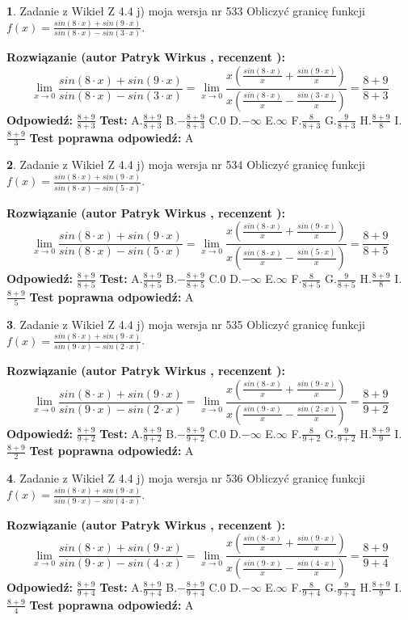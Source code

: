 \documentclass[12pt, a4paper]{article}
\theoremstyle{definition} %
\newtheorem{zad}{}
\newcommand{\zadStart}[1]{\begin{zad}#1\newline}
\newcommand{\zadStop}{\end{zad}}
\newcommand{\rozwStart}[2]{\noindent \textbf{Rozwiązanie (autor #1 , recenzent #2): }\newline}
\newcommand{\rozwStop}{\newline}
\newcommand{\odpStart}{\noindent \textbf{Odpowiedź:}\newline}
\newcommand{\odpStop}{\newline}
\newcommand{\testStart}{\noindent \textbf{Test:}\newline}
\newcommand{\testStop}{\newline}
\newcommand{\kluczStart}{\noindent \textbf{Test poprawna odpowiedź:}\newline}
\newcommand{\kluczStop}{\newline}
\begin{document}
\zadStart{Zadanie z Wikieł Z 4.4 j) moja wersja nr 533}
Obliczyć granicę funkcji $f(x)=\frac{sin(8\cdot x) +sin(9\cdot x)}{sin(8\cdot x) -sin(3\cdot x)}$.
\zadStop
\rozwStart{Patryk Wirkus}{}
$$\lim\limits_{x\to 0}\frac{sin(8\cdot x) +sin(9\cdot x)}{sin(8\cdot x) -sin(3\cdot x)}=\lim\limits_{x\to 0}\frac{x(\frac{sin(8\cdot x)}{x}+\frac{sin(9\cdot x)}{x})}{x(\frac{sin(8\cdot x)}{x}-\frac{sin(3\cdot x)}{x})}=\frac{8+9}{8+3}$$
\rozwStop
\odpStart
$\frac{8+9}{8+3}$
\odpStop
\testStart
A.$\frac{8+9}{8+3}$
B.$-\frac{8+9}{8+3}$
C.$0$
D.$-\infty$
E.$\infty$
F.$\frac{8}{8+3}$
G.$\frac{9}{8+3}$
H.$\frac{8+9}{8}$
I.$\frac{8+9}{3}$
\testStop
\kluczStart
A
\kluczStop



\zadStart{Zadanie z Wikieł Z 4.4 j) moja wersja nr 534}
Obliczyć granicę funkcji $f(x)=\frac{sin(8\cdot x) +sin(9\cdot x)}{sin(8\cdot x) -sin(5\cdot x)}$.
\zadStop
\rozwStart{Patryk Wirkus}{}
$$\lim\limits_{x\to 0}\frac{sin(8\cdot x) +sin(9\cdot x)}{sin(8\cdot x) -sin(5\cdot x)}=\lim\limits_{x\to 0}\frac{x(\frac{sin(8\cdot x)}{x}+\frac{sin(9\cdot x)}{x})}{x(\frac{sin(8\cdot x)}{x}-\frac{sin(5\cdot x)}{x})}=\frac{8+9}{8+5}$$
\rozwStop
\odpStart
$\frac{8+9}{8+5}$
\odpStop
\testStart
A.$\frac{8+9}{8+5}$
B.$-\frac{8+9}{8+5}$
C.$0$
D.$-\infty$
E.$\infty$
F.$\frac{8}{8+5}$
G.$\frac{9}{8+5}$
H.$\frac{8+9}{8}$
I.$\frac{8+9}{5}$
\testStop
\kluczStart
A
\kluczStop



\zadStart{Zadanie z Wikieł Z 4.4 j) moja wersja nr 535}
Obliczyć granicę funkcji $f(x)=\frac{sin(8\cdot x) +sin(9\cdot x)}{sin(9\cdot x) -sin(2\cdot x)}$.
\zadStop
\rozwStart{Patryk Wirkus}{}
$$\lim\limits_{x\to 0}\frac{sin(8\cdot x) +sin(9\cdot x)}{sin(9\cdot x) -sin(2\cdot x)}=\lim\limits_{x\to 0}\frac{x(\frac{sin(8\cdot x)}{x}+\frac{sin(9\cdot x)}{x})}{x(\frac{sin(9\cdot x)}{x}-\frac{sin(2\cdot x)}{x})}=\frac{8+9}{9+2}$$
\rozwStop
\odpStart
$\frac{8+9}{9+2}$
\odpStop
\testStart
A.$\frac{8+9}{9+2}$
B.$-\frac{8+9}{9+2}$
C.$0$
D.$-\infty$
E.$\infty$
F.$\frac{8}{9+2}$
G.$\frac{9}{9+2}$
H.$\frac{8+9}{9}$
I.$\frac{8+9}{2}$
\testStop
\kluczStart
A
\kluczStop



\zadStart{Zadanie z Wikieł Z 4.4 j) moja wersja nr 536}
Obliczyć granicę funkcji $f(x)=\frac{sin(8\cdot x) +sin(9\cdot x)}{sin(9\cdot x) -sin(4\cdot x)}$.
\zadStop
\rozwStart{Patryk Wirkus}{}
$$\lim\limits_{x\to 0}\frac{sin(8\cdot x) +sin(9\cdot x)}{sin(9\cdot x) -sin(4\cdot x)}=\lim\limits_{x\to 0}\frac{x(\frac{sin(8\cdot x)}{x}+\frac{sin(9\cdot x)}{x})}{x(\frac{sin(9\cdot x)}{x}-\frac{sin(4\cdot x)}{x})}=\frac{8+9}{9+4}$$
\rozwStop
\odpStart
$\frac{8+9}{9+4}$
\odpStop
\testStart
A.$\frac{8+9}{9+4}$
B.$-\frac{8+9}{9+4}$
C.$0$
D.$-\infty$
E.$\infty$
F.$\frac{8}{9+4}$
G.$\frac{9}{9+4}$
H.$\frac{8+9}{9}$
I.$\frac{8+9}{4}$
\testStop
\kluczStart
A
\kluczStop
\end{document}
